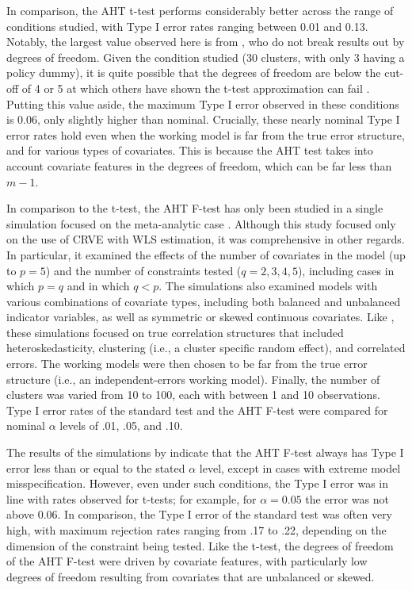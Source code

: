 \documentclass[12pt]{article}\usepackage[]{graphicx}\usepackage[]{color}
\begin{document}
In comparison, the AHT t-test performs considerably better across the range of conditions studied, with Type I error rates ranging between 0.01 and 0.13.
Notably, the largest value observed here is from \citet{Imbens2015robust}, who do not break results out by degrees of freedom. 
Given the condition studied (30 clusters, with only 3 having a policy dummy), it is quite possible that the degrees of freedom are below the cut-off of 4 or 5 at which others have shown the t-test approximation can fail \citep{Tipton2015small-t}. 
Putting this value aside, the maximum Type I error observed in these conditions is 0.06, only slightly higher than nominal.
Crucially, these nearly nominal Type I error rates hold even when the working model is far from the true error structure, and for various types of covariates.
This is because the AHT test takes into account covariate features in the degrees of freedom, which can be far less than $m - 1$.

In comparison to the t-test, the AHT F-test has only been studied in a single simulation focused on the meta-analytic case \citep{Tipton2015small-F}.
Although this study focused only on the use of CRVE with WLS estimation, it was comprehensive in other regards.
In particular, it examined the effects of the number of covariates in the model (up to $p = 5$) and the number of constraints tested ($q = 2,3,4,5$), including cases in which $p = q$ and in which $q < p$. 
The simulations also examined models with various combinations of covariate types, including both balanced and unbalanced indicator variables, as well as symmetric or skewed continuous covariates.
Like \citet{Tipton2015small-t}, these simulations focused on true correlation structures that included heteroskedasticity, clustering (i.e., a cluster specific random effect), and correlated errors.
The working models were then chosen to be far from the true error structure (i.e., an independent-errors working model).
Finally, the number of clusters was varied from 10 to 100, each with between 1 and 10 observations. 
Type I error rates of the standard test and the AHT F-test were compared for nominal $\alpha$ levels of .01, .05, and .10.

The results of the simulations by \citet{Tipton2015small-F} indicate that the AHT F-test always has Type I error less than or equal to the stated $\alpha$ level, except in cases with extreme model misspecification. 
However, even under such conditions, the Type I error was in line with rates observed for t-tests; for example, for $\alpha = 0.05$ the error was not above 0.06. 
In comparison, the Type I error of the standard test was often very high, with maximum rejection rates ranging from .17 to .22, depending on the dimension of the constraint being tested.
Like the t-test, the degrees of freedom of the AHT F-test were driven by covariate features, with particularly low degrees of freedom resulting from covariates that are unbalanced or skewed.
\end{document}
